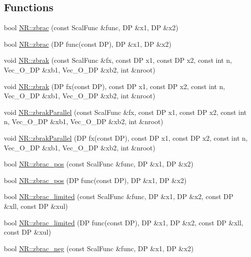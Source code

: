 \subsection*{Functions}
\begin{DoxyCompactItemize}
\item 
bool \mbox{\hyperlink{namespaceNR_aec41661a6d34a54e59e37058f380730c}{N\+R\+::zbrac}} (const Scal\+Func \&func, DP \&x1, DP \&x2)
\item 
bool \mbox{\hyperlink{namespaceNR_a4dbd7cac092f614af934413917fc22d4}{N\+R\+::zbrac}} (DP func(const DP), DP \&x1, DP \&x2)
\item 
void \mbox{\hyperlink{namespaceNR_a83128554a5aed28c6d59ecb925577945}{N\+R\+::zbrak}} (const Scal\+Func \&fx, const DP x1, const DP x2, const int n, Vec\+\_\+\+O\+\_\+\+DP \&xb1, Vec\+\_\+\+O\+\_\+\+DP \&xb2, int \&nroot)
\item 
void \mbox{\hyperlink{namespaceNR_ac611c5e25767065397e735aab1a07bf8}{N\+R\+::zbrak}} (DP fx(const DP), const DP x1, const DP x2, const int n, Vec\+\_\+\+O\+\_\+\+DP \&xb1, Vec\+\_\+\+O\+\_\+\+DP \&xb2, int \&nroot)
\item 
void \mbox{\hyperlink{namespaceNR_a2cabd01c9ff7c4250cefe4cb1d545f49}{N\+R\+::zbrak\+Parallel}} (const Scal\+Func \&fx, const DP x1, const DP x2, const int n, Vec\+\_\+\+O\+\_\+\+DP \&xb1, Vec\+\_\+\+O\+\_\+\+DP \&xb2, int \&nroot)
\item 
void \mbox{\hyperlink{namespaceNR_aca7c15b9ebf8da85b483508c7352938f}{N\+R\+::zbrak\+Parallel}} (DP fx(const DP), const DP x1, const DP x2, const int n, Vec\+\_\+\+O\+\_\+\+DP \&xb1, Vec\+\_\+\+O\+\_\+\+DP \&xb2, int \&nroot)
\item 
bool \mbox{\hyperlink{namespaceNR_ab8c06a4592a772cfbeed372a197e2538}{N\+R\+::zbrac\+\_\+pos}} (const Scal\+Func \&func, DP \&x1, DP \&x2)
\item 
bool \mbox{\hyperlink{namespaceNR_afec512a07e73837d2a2f77ccbbce93db}{N\+R\+::zbrac\+\_\+pos}} (DP func(const DP), DP \&x1, DP \&x2)
\item 
bool \mbox{\hyperlink{namespaceNR_a01001dd7f12b7d7ef40d7b3f77bc84e7}{N\+R\+::zbrac\+\_\+limited}} (const Scal\+Func \&func, DP \&x1, DP \&x2, const DP \&xll, const DP \&xul)
\item 
bool \mbox{\hyperlink{namespaceNR_a843139adc6ba0089d6840b84ea7e935a}{N\+R\+::zbrac\+\_\+limited}} (DP func(const DP), DP \&x1, DP \&x2, const DP \&xll, const DP \&xul)
\item 
bool \mbox{\hyperlink{namespaceNR_a4f88ac71576d19d1bb1e167e6f5b1bdc}{N\+R\+::zbrac\+\_\+neg}} (const Scal\+Func \&func, DP \&x1, DP \&x2)

\end{DoxyCompactItemize}
